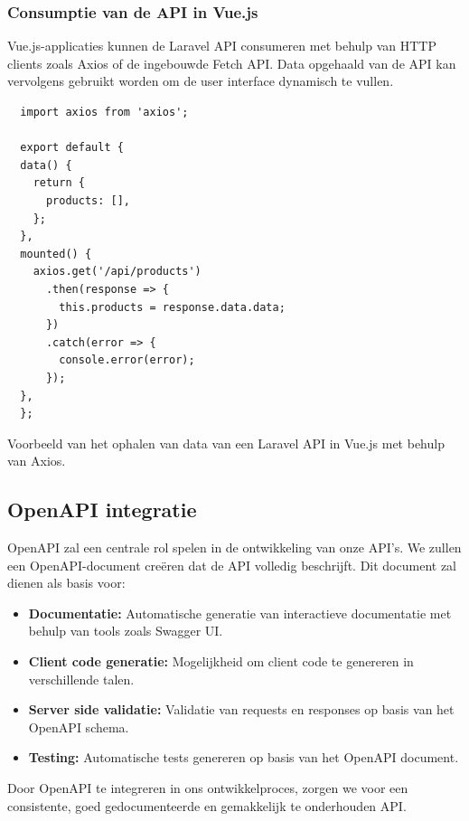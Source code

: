 \subsubsection{Consumptie van de API in Vue.js}

Vue.js-applicaties kunnen de Laravel API consumeren met behulp van HTTP clients zoals Axios of de ingebouwde Fetch API. Data opgehaald van de API kan vervolgens gebruikt worden om de user interface dynamisch te vullen.

\begin{listing}[H]
\begin{verbatim}
  import axios from 'axios';

  export default {
  data() {
    return {
      products: [],
    };
  },
  mounted() {
    axios.get('/api/products')
      .then(response => {
        this.products = response.data.data;
      })
      .catch(error => {
        console.error(error);
      });
  },
  };
\end{verbatim}
\caption[Voorbeeld van het ophalen van data van een Laravel API in Vue.js]{Voorbeeld van het ophalen van data van een Laravel API in Vue.js met behulp van Axios.}
\label{lst:vue_axios}
\end{listing}

\subsection{OpenAPI integratie}

OpenAPI zal een centrale rol spelen in de ontwikkeling van onze API's. We zullen een OpenAPI-document creëren dat de API volledig beschrijft. Dit document zal dienen als basis voor:

\begin{itemize}
  \item \textbf{Documentatie:} Automatische generatie van interactieve documentatie met behulp van tools zoals Swagger UI.
  \item \textbf{Client code generatie:} Mogelijkheid om client code te genereren in verschillende talen.
  \item \textbf{Server side validatie:} Validatie van requests en responses op basis van het OpenAPI schema.
  \item \textbf{Testing:} Automatische tests genereren op basis van het OpenAPI document.
\end{itemize}

Door OpenAPI te integreren in ons ontwikkelproces, zorgen we voor een consistente, goed gedocumenteerde en gemakkelijk te onderhouden API.

